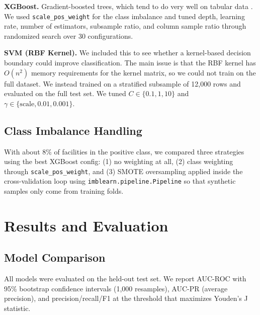 \documentclass[11pt]{article}
\begin{document}
\textbf{XGBoost.} Gradient-boosted trees, which tend to do very well on tabular data \cite{chen2016}. We used \texttt{scale\_pos\_weight} for the class imbalance and tuned depth, learning rate, number of estimators, subsample ratio, and column sample ratio through randomized search over 30 configurations.

\textbf{SVM (RBF Kernel).} We included this to see whether a kernel-based decision boundary could improve classification. The main issue is that the RBF kernel has $O(n^2)$ memory requirements for the kernel matrix, so we could not train on the full dataset. We instead trained on a stratified subsample of 12,000 rows and evaluated on the full test set. We tuned $C \in \{0.1, 1, 10\}$ and $\gamma \in \{\text{scale}, 0.01, 0.001\}$.

\subsection{Class Imbalance Handling}

With about 8\% of facilities in the positive class, we compared three strategies using the best XGBoost config: (1) no weighting at all, (2) class weighting through \texttt{scale\_pos\_weight}, and (3) SMOTE oversampling applied inside the cross-validation loop using \texttt{imblearn.pipeline.Pipeline} so that synthetic samples only come from training folds.


\section{Results and Evaluation}

\subsection{Model Comparison}

All models were evaluated on the held-out test set. We report AUC-ROC with 95\% bootstrap confidence intervals (1,000 resamples), AUC-PR (average precision), and precision/recall/F1 at the threshold that maximizes Youden's J statistic.
\end{document}
